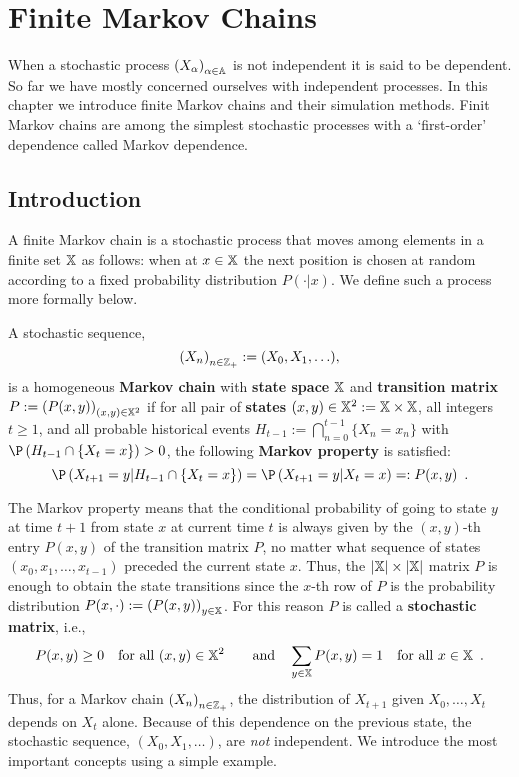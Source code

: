 \chapter{Finite Markov Chains}

When a stochastic process $\left(X_{\alpha} \right)_{\alpha \in \mathbb{A}}$ is not independent it is said to be dependent.  
So far we have mostly concerned ourselves with independent processes.  
In this chapter we introduce finite Markov chains and their  simulation methods.
Finit Markov chains are among the simplest stochastic processes with a `first-order' dependence called Markov dependence.

\section{Introduction}\label{S:FiniteMCIntro}
A finite Markov chain is a stochastic process that moves among elements in a finite set $\mathbb{X}$ as follows: when at $x \in \mathbb{X}$ the next position is chosen at random according to a fixed probability distribution $P(\cdot | x)$.  We define such a process more formally below.

\begin{definition}\label{D:TimeHomFiniteMC}
A stochastic sequence, $$\left(X_n\right)_{n \in \mathbb{Z}_+} := (X_0,X_1,\ldots),$$ is a homogeneous {\bf Markov chain} with {\bf state space} $\mathbb{X}$ and {\bf transition matrix} $P:=\left(P(x,y)\right)_{(x,y)\in \mathbb{X}^2}$ if for all pair of {\bf states} ${(x,y)\in \mathbb{X}^2 := \mathbb{X} \times \mathbb{X}}$, all integers $t \geq 1$, and all probable historical events $H_{t-1} := \bigcap_{n=0}^{t-1} \{ X_n = x_n \}$ with $\P \left(H_{t-1} \cap \{X_t = x\} \right) > 0$, the following {\bf Markov property} is satisfied: 
\begin{equation}\label{E:FiniteMarkovProperty}
\P\left(X_{t+1} = y | H_{t-1} \cap \{X_t = x\} \right)=\P\left(X_{t+1} = y | X_t = x \right) =: P(x,y) \enspace .
\end{equation}
\end{definition}
The Markov property means that the conditional probability of going to state $y$ at time $t+1$ from state $x$ at current time $t$ is always given by the $(x,y)$-th entry $P(x,y)$ of the transition matrix $P$, no matter what sequence of states $(x_0,x_1,\ldots,x_{t-1})$ preceded the current state $x$.  Thus, the $|\mathbb{X}| \times |\mathbb{X}|$ matrix $P$ is enough to obtain the state transitions since the $x$-th row of $P$ is the probability distribution $P(x,\cdot) := \left( P(x,y) \right)_{y \in \mathbb{X}}$.  For this reason $P$ is called a {\bf stochastic matrix}, i.e.,
\begin{equation}\label{E:StochasticMatrixConds}
P(x,y) \geq 0 \quad \text{for all } (x,y) \in \mathbb{X}^2 \qquad \text{and} \quad \sum_{y \in \mathbb{X}} P(x,y) = 1 \quad \text{for all } x \in \mathbb{X} \enspace .
\end{equation}
Thus, for a Markov chain $\left(X_n\right)_{n \in \mathbb{Z}_+}$, the distribution of $X_{t+1}$ given $X_0,\ldots,X_t$  depends on $X_t$ alone. Because of this dependence on the previous state, the stochastic sequence, $(X_0,X_1,\ldots)$, are {\it not} independent.  We introduce the most important concepts using a simple example.


